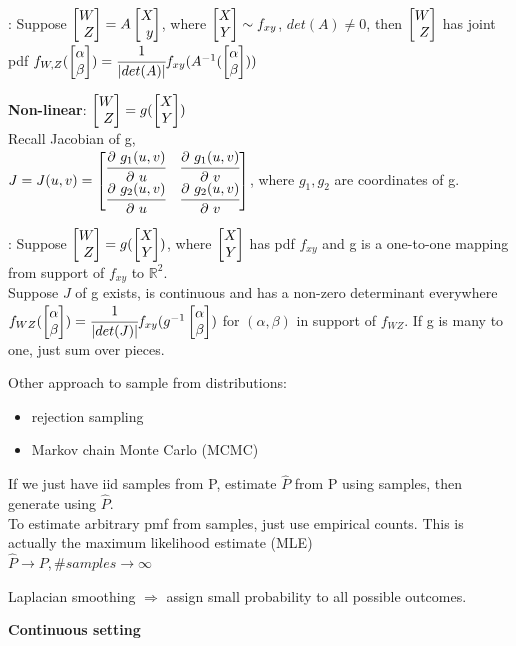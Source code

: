 \documentclass[12pt,a4paper]{article}
\begin{document}
\thm: Suppose $\vecb{W\\Z}=A\vecb{X\\y}$, where $\vecb{X\\Y}\sim f_{xy}$, $det(A)\neq 0$, then $\vecb{W\\Z}$ has joint pdf $f_{W,Z}(\vecb{\alpha\\\beta})=\cfrac{1}{|det(A)|}f_{xy}(A^{-1}(\vecb{\alpha\\\beta}))$

\vspace{0.5cm}
\textbf{Non-linear}: $\vecb{W\\Z}=g(\vecb{X\\Y})$\\
Recall Jacobian of g, \\
$J=J(u,v)=\vecb{\pfrac{g_1(u,v)}{u} & \pfrac{g_1(u,v)}{v}\\
\pfrac{g_2(u,v)}{u} & \pfrac{g_2(u,v)}{v}}$, where $g_1, g_2$ are coordinates of g.

\thm: Suppose $\vecb{W\\Z}=g(\vecb{X\\Y})$, where $\vecb{X\\Y}$ has pdf $f_{xy}$ and g is a one-to-one mapping from support of $f_{xy}$ to $\mathbb{R}^2$. \\
Suppose $J$ of g exists, is continuous and has a non-zero determinant everywhere\\
$f_{WZ}(\vecab)=\cfrac{1}{|det(J)|}f_{xy}(g^{-1}\vecab)$ for $(\alpha,\beta)$ in support of $f_{WZ}$. If g is many to one, just sum over pieces. 

Other approach to sample from distributions:
\begin{itemize}
\item rejection sampling
\item Markov chain Monte Carlo (MCMC)
\end{itemize}

\vspace{0.5cm}
If we just have iid samples from P, estimate $\hat{P}$ from P using samples, then generate using $\hat{P}$.\\
To estimate arbitrary pmf from samples, just use empirical counts. This is actually the maximum likelihood estimate (MLE) \\
$\hat{P}\rightarrow P, \#samples\rightarrow \infty$

Laplacian smoothing $\Rightarrow$ assign small probability to all possible outcomes. 

\textbf{Continuous setting}
\end{document}
